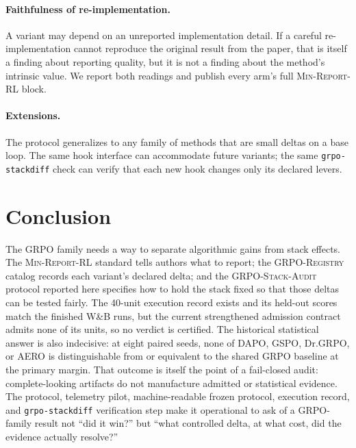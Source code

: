 \documentclass[11pt]{article}
\newcommand{\minreport}{\textsc{Min-Report-RL}}
\newcommand{\grpo}{\textsc{GRPO}}
\newcommand{\audit}{\textsc{GRPO-Stack-Audit}}
\newcommand{\grpoReg}{\textsc{GRPO-Registry}}
\begin{document}
\paragraph{Faithfulness of re-implementation.} A variant may depend on an
unreported implementation detail. If a careful re-implementation cannot
reproduce the original result from the paper, that is itself a finding about
reporting quality, but it is not a finding about the method's intrinsic value.
We report both readings and publish every arm's full \minreport{} block.

\paragraph{Extensions.} The protocol generalizes to any family of methods that
are small deltas on a base loop. The same hook interface can accommodate
future variants; the same \texttt{grpo-stackdiff} check can verify that each
new hook changes only its declared levers.

\section{Conclusion}

The \grpo{} family needs a way to separate algorithmic gains from stack
effects. The \minreport{} standard tells authors what to report; the
\grpoReg{} catalog records each variant's declared delta; and the \audit{}
protocol reported here specifies how to hold the stack fixed so that those
deltas can be tested fairly. The 40-unit execution record exists and its
held-out scores match the finished W\&B runs, but the current strengthened
admission contract admits none of its units, so no verdict is certified. The
historical statistical answer is also indecisive: at eight paired seeds, none
of DAPO, GSPO, Dr.\grpo{}, or AERO is distinguishable from or equivalent to
the shared GRPO baseline at the primary margin. That outcome is itself the
point of a fail-closed audit: complete-looking artifacts do not manufacture
admitted or statistical evidence.
The protocol, telemetry pilot, machine-readable frozen protocol, execution
record, and \texttt{grpo-stackdiff} verification step make it operational to
ask of a GRPO-family result not ``did it win?'' but ``what controlled delta,
at what cost, did the evidence actually resolve?''



\end{document}
